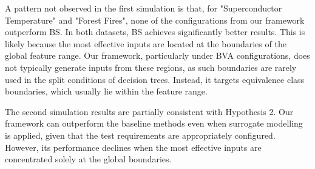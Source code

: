 \documentclass[
]{ceurart}
\theoremstyle{definition}
\begin{document}
A pattern not observed in the first simulation is that, for "Superconductor Temperature" and "Forest Fires", none of the configurations from our framework outperform BS. In both datasets, BS achieves significantly better results. This is likely because the most effective inputs are located at the boundaries of the global feature range. Our framework, particularly under BVA configurations, does not typically generate inputs from these regions, as such boundaries are rarely used in the split conditions of decision trees. Instead, it targets equivalence class boundaries, which usually lie within the feature range.

The second simulation results are partially consistent with Hypothesis 2. Our framework can outperform the baseline methods even when surrogate modelling is applied, given that the test requirements are appropriately configured. However, its performance declines when the most effective inputs are concentrated solely at the global boundaries.
\end{document}
